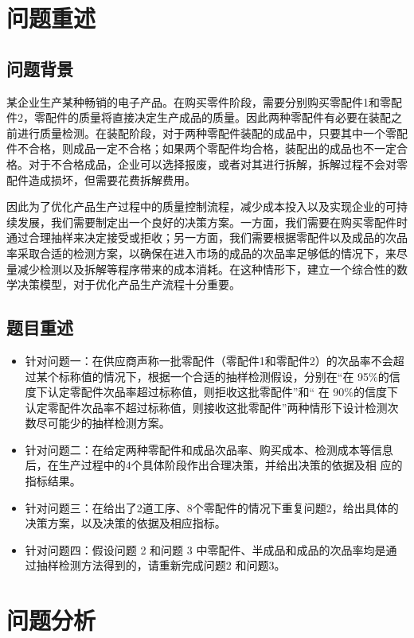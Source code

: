 \documentclass[utf8]{ctexart} %
\begin{document}
		\section{问题重述}   
		\subsection{问题背景}
		某企业生产某种畅销的电子产品。在购买零件阶段，需要分别购买零配件1和零配件2，零配件的质量将直接决定生产成品的质量。因此两种零配件有必要在装配之前进行质量检测。在装配阶段，对于两种零配件装配的成品中，只要其中一个零配件不合格，则成品一定不合格；如果两个零配件均合格，装配出的成品也不一定合格。对于不合格成品，企业可以选择报废，或者对其进行拆解，拆解过程不会对零配件造成损坏，但需要花费拆解费用。
		
		因此为了优化产品生产过程中的质量控制流程，减少成本投入以及实现企业的可持续发展，我们需要制定出一个良好的决策方案。一方面，我们需要在购买零配件时通过合理抽样来决定接受或拒收；另一方面，我们需要根据零配件以及成品的次品率采取合适的检测方案，以确保在进入市场的成品的次品率足够低的情况下，来尽量减少检测以及拆解等程序带来的成本消耗。在这种情形下，建立一个综合性的数学决策模型，对于优化产品生产流程十分重要。
		
		\subsection{题目重述}

		\begin{itemize} %
			\item	针对问题一：在供应商声称一批零配件（零配件1和零配件2）的次品率不会超过某个标称值的情况下，根据一个合适的抽样检测假设，分别在“在 95\%的信度下认定零配件次品率超过标称值，则拒收这批零配件”和“ 在 90\%的信度下认定零配件次品率不超过标称值，则接收这批零配件”两种情形下设计检测次数尽可能少的抽样检测方案。
			\item 针对问题二：在给定两种零配件和成品次品率、购买成本、检测成本等信息后，在生产过程中的4个具体阶段作出合理决策，并给出决策的依据及相
			应的指标结果。
			\item 针对问题三：在给出了2道工序、8个零配件的情况下重复问题2，给出具体的决策方案，以及决策的依据及相应指标。
			\item 针对问题四：假设问题 2 和问题 3 中零配件、半成品和成品的次品率均是通过抽样检测方法得到的，请重新完成问题2 和问题3。
		\end{itemize}
		

		\section{问题分析}
\end{document}
